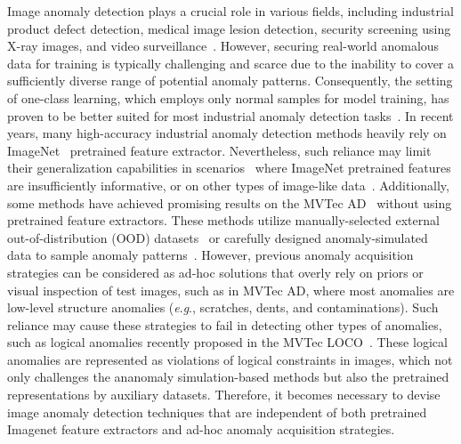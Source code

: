 \documentclass[letterpaper]{article} %
\newcommand{\eg}{\textit{e}.\textit{g}.}
\begin{document}
Image anomaly detection plays a crucial role in various fields, including industrial product defect detection, medical image lesion detection, security screening using X-ray images, and video surveillance~\cite{ComplentaryGAN, MVTecAD, app1, app2, GANomaly}. However, securing real-world anomalous data for training is typically challenging and scarce due to the inability to cover a sufficiently diverse range of potential anomaly patterns. %
Consequently, the setting of one-class learning, which employs only normal samples for model training, has proven to be better suited for most industrial anomaly detection tasks~\cite{MVTecAD, MVloco}. 
In recent years, many high-accuracy industrial anomaly detection methods heavily rely on ImageNet~\cite{ImageNet10} pretrained feature extractor. Nevertheless, such reliance may limit their generalization capabilities in scenarios~\cite{MVloco} where ImageNet pretrained features are insufficiently informative, or on other types of image-like data~\cite{mvtec3D, BackTo3dFeatures}. Additionally, some methods have achieved promising results on the MVTec AD~\cite{MVTecAD} without using pretrained feature extractors. These methods utilize manually-selected external out-of-distribution (OOD) datasets~\cite{FCDD} or carefully designed anomaly-simulated data to sample anomaly patterns~\cite{CutPaste, DRAEM, SLSG}. However, previous anomaly acquisition strategies can be considered as ad-hoc solutions that overly rely on priors or visual inspection of test images, such as in MVTec AD, where most anomalies are low-level structure anomalies (\eg, scratches, dents, and contaminations). Such reliance may cause these strategies to fail in detecting other types of anomalies, such as logical anomalies recently proposed in the MVTec LOCO~\cite{MVloco}. These logical anomalies are represented as violations of logical constraints in images, which not only challenges the ananomaly simulation-based methods but also the pretrained representations by auxiliary datasets. Therefore, it becomes necessary to devise image anomaly detection techniques that are independent of both pretrained Imagenet feature extractors and ad-hoc anomaly acquisition strategies.
\end{document}
